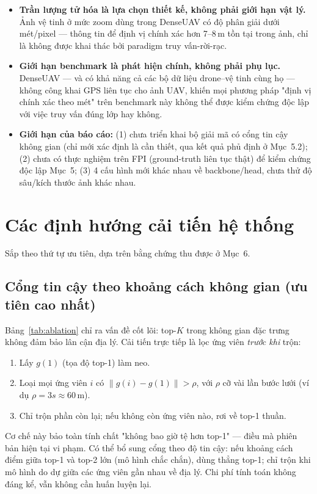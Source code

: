 \documentclass[11pt]{article}
\begin{document}
\begin{itemize}
  \item \textbf{Trần lượng tử hóa là lựa chọn thiết kế, không phải giới hạn vật lý.} Ảnh vệ tinh ở mức zoom dùng trong DenseUAV có độ phân giải dưới mét/pixel — thông tin để định vị chính xác hơn 7--8\,m tồn tại trong ảnh, chỉ là không được khai thác bởi paradigm truy vấn-rời-rạc.
  \item \textbf{Giới hạn benchmark là phát hiện chính, không phải phụ lục.} DenseUAV — và có khả năng cả các bộ dữ liệu drone--vệ tinh cùng họ — không công khai GPS liên tục cho ảnh UAV, khiến mọi phương pháp "định vị chính xác theo mét" trên benchmark này không thể được kiểm chứng độc lập với việc truy vấn đúng lớp hay không.
  \item \textbf{Giới hạn của báo cáo:} (1) chưa triển khai bộ giải mã có cổng tin cậy không gian (chỉ mới xác định là cần thiết, qua kết quả phủ định ở Mục~5.2); (2) chưa có thực nghiệm trên FPI (ground-truth liên tục thật) để kiểm chứng độc lập Mục~5; (3) 4 cấu hình mới khác nhau về backbone/head, chưa thử độ sâu/kích thước ảnh khác nhau.
\end{itemize}

\section{Các định hướng cải tiến hệ thống}

Sắp theo thứ tự ưu tiên, dựa trên bằng chứng thu được ở Mục~6.

\subsection{Cổng tin cậy theo khoảng cách không gian (ưu tiên cao nhất)}

Bảng~\ref{tab:ablation} chỉ ra vấn đề cốt lõi: top-$K$ trong không gian đặc trưng không đảm bảo lân cận địa lý. Cải tiến trực tiếp là lọc ứng viên \emph{trước khi} trộn:
\begin{enumerate}
  \item Lấy $g(1)$ (tọa độ top-1) làm neo.
  \item Loại mọi ứng viên $i$ có $\|g(i) - g(1)\| > \rho$, với $\rho$ cỡ vài lần bước lưới (ví dụ $\rho = 3s \approx 60$\,m).
  \item Chỉ trộn phần còn lại; nếu không còn ứng viên nào, rơi về top-1 thuần.
\end{enumerate}
Cơ chế này bảo toàn tính chất "không bao giờ tệ hơn top-1" --- điều mà phiên bản hiện tại vi phạm. Có thể bổ sung cổng theo độ tin cậy: nếu khoảng cách điểm giữa top-1 và top-2 lớn (mô hình chắc chắn), dùng thẳng top-1; chỉ trộn khi mô hình do dự giữa các ứng viên gần nhau về địa lý. Chi phí tính toán không đáng kể, vẫn không cần huấn luyện lại.
\end{document}
